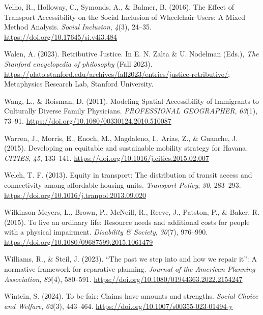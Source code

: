 \documentclass[
  letterpaper,
  DIV=11,
  numbers=noendperiod]{scrartcl}
\newlength{\cslhangindent}
\newenvironment{CSLReferences}[2] %
 {\begin{list}{}{%
  \setlength{\itemindent}{0pt}
  \setlength{\leftmargin}{0pt}
  \setlength{\parsep}{0pt}
  \ifodd #1
   \setlength{\leftmargin}{\cslhangindent}
   \setlength{\itemindent}{-1\cslhangindent}
  \fi
  \setlength{\itemsep}{#2\baselineskip}}}
 {\end{list}}
\begin{document}
\begin{CSLReferences}{1}{0}
Velho, R., Holloway, C., Symonds, A., \& Balmer, B. (2016). The {Effect}
of {Transport Accessibility} on the {Social Inclusion} of {Wheelchair
Users}: {A Mixed Method Analysis}. \emph{Social Inclusion}, \emph{4}(3),
24--35. \url{https://doi.org/10.17645/si.v4i3.484}

Walen, A. (2023). {Retributive Justice}. In E. N. Zalta \& U. Nodelman
(Eds.), \emph{The {Stanford} encyclopedia of philosophy} ({F}all 2023).
\url{https://plato.stanford.edu/archives/fall2023/entries/justice-retributive/};
Metaphysics Research Lab, Stanford University.

Wang, L., \& Roisman, D. (2011). Modeling {Spatial Accessibility} of
{Immigrants} to {Culturally Diverse Family Physicians}.
\emph{PROFESSIONAL GEOGRAPHER}, \emph{63}(1), 73--91.
\url{https://doi.org/10.1080/00330124.2010.510087}

Warren, J., Morris, E., Enoch, M., Magdaleno, I., Arias, Z., \& Guanche,
J. (2015). Developing an equitable and sustainable mobility strategy for
{Havana}. \emph{CITIES}, \emph{45}, 133--141.
\url{https://doi.org/10.1016/j.cities.2015.02.007}

Welch, T. F. (2013). Equity in transport: {The} distribution of transit
access and connectivity among affordable housing units. \emph{Transport
Policy}, \emph{30}, 283--293.
\url{https://doi.org/10.1016/j.tranpol.2013.09.020}

Wilkinson-Meyers, L., Brown, P., McNeill, R., Reeve, J., Patston, P., \&
Baker, R. (2015). To live an ordinary life: Resource needs and
additional costs for people with a physical impairment. \emph{Disability
\& Society}, \emph{30}(7), 976--990.
\url{https://doi.org/10.1080/09687599.2015.1061479}

Williams, R., \& Steil, J. (2023). {``The past we step into and how we
repair it''}: A normative framework for reparative planning.
\emph{Journal of the American Planning Association}, \emph{89}(4),
580--591. \url{https://doi.org/10.1080/01944363.2022.2154247}

Wintein, S. (2024). To be fair: Claims have amounts and strengths.
\emph{Social Choice and Welfare}, \emph{62}(3), 443--464.
\url{https://doi.org/10.1007/s00355-023-01494-y}


\end{CSLReferences}
\end{document}
